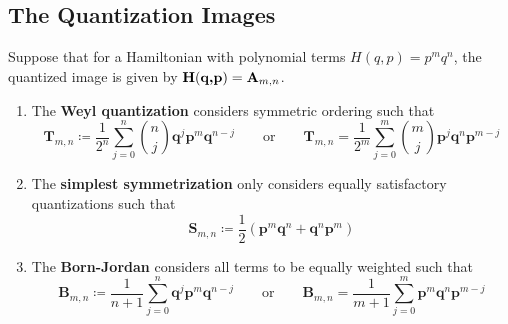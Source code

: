 \documentclass[a4paper]{article}
\theoremstyle{definition}
\begin{document}
		\subsection{The Quantization Images}
		Suppose that for a Hamiltonian with polynomial terms $H(q,p)=p^mq^n$, the quantized image is given by \cite{Bagunu2025,Born1926,Domingo2015} $\textbf{H}(\textbf{q,\textbf{p}})=\textbf{A}_{m,n}$. 
		\begin{enumerate}
			\item The \textbf{Weyl quantization} considers symmetric ordering such that
			\begin{equation}\label{eqn:weyl}
				\textbf{T}_{m,n}\coloneqq\frac{1}{2^n}\sum_{j=0}^n\binom{n}{j}\textbf{q}^j\textbf{p}^m\textbf{q}^{n-j}\qquad\text{or}\qquad\textbf{T}_{m,n}=\frac{1}{2^m}\sum_{j=0}^m\binom{m}{j}\textbf{p}^j\textbf{q}^n\textbf{p}^{m-j}
			\end{equation}
			\item The \textbf{simplest symmetrization} only considers equally satisfactory quantizations such that
			\begin{equation}\label{eqn:ss}
				\textbf{S}_{m,n}\coloneqq\frac{1}{2}(\textbf{p}^m\textbf{q}^n+\textbf{q}^n\textbf{p}^m)
			\end{equation}
			\item The \textbf{Born-Jordan} considers all terms to be equally weighted such that
			\begin{equation}\label{eqn:bj}
				\textbf{B}_{m,n}\coloneqq\frac{1}{n+1}\sum_{j=0}^n\textbf{q}^j\textbf{p}^m\textbf{q}^{n-j}\qquad\text{or}\qquad\textbf{B}_{m,n}=\frac{1}{m+1}\sum_{j=0}^m\textbf{p}^m\textbf{q}^n\textbf{p}^{m-j}
			\end{equation}
		\end{enumerate}
\end{document}
